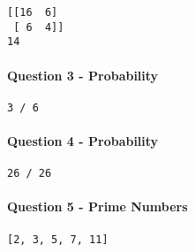 \begin{verbatim}
[[16  6]
 [ 6  4]]
14
\end{verbatim}

\paragraph{Question 3 - Probability}\label{question-3---probability}

\begin{Shaded}
\begin{Highlighting}[]
\NormalTok{(}\NormalTok{)}
\end{Highlighting}
\end{Shaded}

\begin{verbatim}
3 / 6
\end{verbatim}

\paragraph{Question 4 - Probability}\label{question-4---probability}

\begin{Shaded}
\begin{Highlighting}[]
\NormalTok{(}\NormalTok{)}
\end{Highlighting}
\end{Shaded}

\begin{verbatim}
26 / 26
\end{verbatim}

\paragraph{Question 5 - Prime Numbers}\label{question-5---prime-numbers}

\begin{Shaded}
\begin{Highlighting}[]
\OperatorTok{=}\NormalTok{ [}\NormalTok{, }\NormalTok{, }\NormalTok{, }\NormalTok{, }\NormalTok{]}
\end{Highlighting}
\end{Shaded}

\begin{verbatim}
[2, 3, 5, 7, 11]
\end{verbatim}

